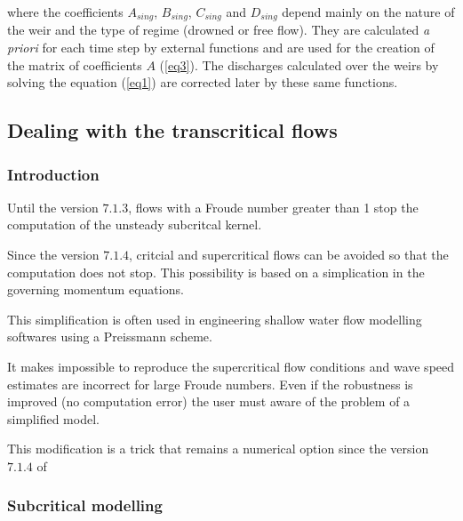 where the coefficients $A_{sing}$, $B_{sing}$, $C_{sing}$ and $D_{sing}$ depend mainly on the nature of the weir and the type of regime (drowned or free flow). They are calculated \textit{a priori} for each time step by external functions and are used for the creation of the matrix of coefficients $A$ (\ref{eq3}). The discharges calculated over the weirs by solving the equation (\ref{eq1}) are corrected later by these same functions.

\subsection{Dealing with the transcritical flows}

\subsubsection{Introduction}

Until the version $7.1.3$, flows with a Froude number greater than 1 stop the computation of the unsteady subcritcal kernel.

Since the version $7.1.4$, critcial and supercritical flows can be avoided so that the computation does not stop.
This possibility is based on a simplication in the governing momentum equations.

This simplification is often used in engineering shallow water flow modelling softwares using a Preissmann scheme.

It makes impossible to reproduce the supercritical flow conditions and wave speed estimates are incorrect for large Froude numbers. Even if the robustness is improved (no computation error) the user must aware of the problem of a simplified model.

This modification is a trick that remains a numerical option since the version $7.1.4$ of \mascaret{}

\subsubsection{Subcritical modelling}

